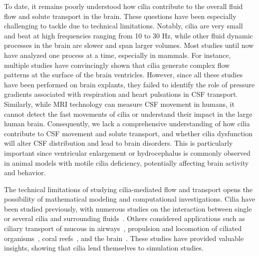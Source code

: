 \documentclass[fleqn]{wlscirep}
\begin{document}
To date, it remains poorly understood how cilia contribute to the overall fluid
flow and solute transport in the brain.
These questions have been especially challenging to tackle due to technical limitations.
Notably, cilia are very small and beat at high frequencies ranging from 10 to 30 Hz,
while other fluid dynamic processes in the brain are slower and span larger volumes.
Most studies until now have analyzed one process at a time, especially in mammals.
For instance, multiple studies have convincingly shown that cilia generate complex
flow patterns at the surface of the brain ventricles.
However, since all these studies have been performed on brain explants, they failed
to identify the role of pressure gradients associated with respiration and heart pulsations in CSF transport.
Similarly, while MRI technology can measure CSF movement in humans, it cannot detect
the fast movements of cilia or understand their impact in the large human brain.
Consequently, we lack a comprehensive understanding of how cilia contribute to CSF
movement and solute transport, and whether cilia dysfunction will alter CSF distribution
and lead to brain disorders.
This is particularly important since ventricular enlargement or hydrocephalus is
commonly observed in animal models with motile cilia deficiency, potentially affecting
brain activity and behavior.

The technical limitations of studying cilia-mediated flow and transport opens the
possibility of mathematical modeling and computational investigations. Cilia have been studied previously,
with numerous studies on the interaction between single or several cilia and surrounding
fluids~\cite{Guo2020SimulatingGeometries, Ruvalcaba2021NumericalTree, Smith2009MathematicalFluids,
Cui2019NumericalMethod, Cui2022AFlow}.
Others considered applications such as ciliary transport of mucous in
airways~\cite{Fulford1986Muco-ciliaryLung, Ramirez-SanJuan2020Multi-scaleArrays},
propulsion and locomotion of ciliated organisms~\cite{BLAKE1974MechanicsMotion,
Jahn1972LocomotionProtozoa, Brennen1977FluidFlagella},
coral reefs~\cite{Pacherres2022CiliaryProduction}, and the brain~\cite{Siyahhan2014FlowVentricles,
Yoshida2022EffectVentricles, Salman2022ComputationalEmbryo, Thouvenin2020OriginCanal}.
These studies have provided valuable insights, showing that cilia lend themselves to simulation studies.
\end{document}
